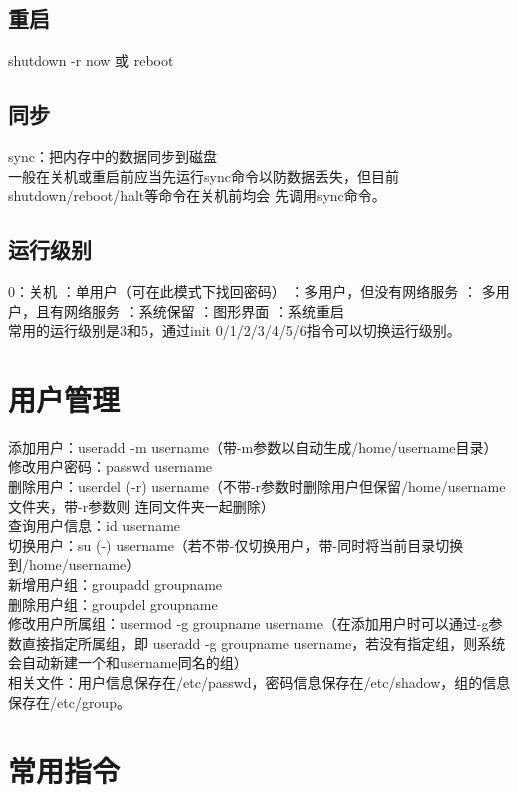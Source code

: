 \documentclass[11pt]{article}
\begin{document}
\subsection{重启}
shutdown -r now \quad 或 \quad reboot

\subsection{同步}
sync：把内存中的数据同步到磁盘  \\
一般在关机或重启前应当先运行sync命令以防数据丢失，但目前shutdown/reboot/halt等命令在关机前均会
先调用sync命令。

\subsection{运行级别}
0：关机 ：单用户（可在此模式下找回密码） ：多用户，但没有网络服务 ：
多用户，且有网络服务 ：系统保留 ：图形界面 ：系统重启  \\
常用的运行级别是3和5，通过init 0/1/2/3/4/5/6指令可以切换运行级别。

\section{用户管理}
添加用户：useradd -m username（带-m参数以自动生成/home/username目录） \\
修改用户密码：passwd username \\
删除用户：userdel (-r) username（不带-r参数时删除用户但保留/home/username文件夹，带-r参数则
连同文件夹一起删除） \\
查询用户信息：id username \\
切换用户：su (-) username（若不带-仅切换用户，带-同时将当前目录切换到/home/username） \\
新增用户组：groupadd groupname \\
删除用户组：groupdel groupname \\
修改用户所属组：usermod -g groupname username（在添加用户时可以通过-g参数直接指定所属组，即
useradd -g groupname username，若没有指定组，则系统会自动新建一个和username同名的组） \\
相关文件：用户信息保存在/etc/passwd，密码信息保存在/etc/shadow，组的信息保存在/etc/group。

\section{常用指令}
\end{document}
